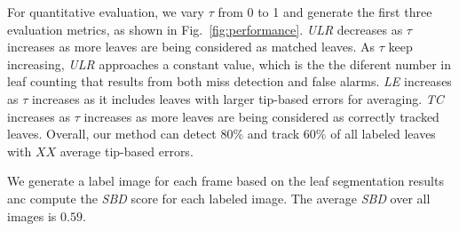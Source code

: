 For quantitative evaluation, we vary $\tau$ from 0 to 1 and generate the first three evaluation metrics, as shown in Fig.~\ref{fig:performance}.
{\it{ULR}} decreases as $\tau$ increases as more leaves are being considered as matched leaves.  
As $\tau$ keep increasing, {\it{ULR}} approaches a constant value, which is the the diferent number in leaf counting that results from both miss detection and false alarms. 
{\it{LE}} increases as $\tau$ increases as it includes leaves with larger tip-based errors for averaging. 
{\it{TC}} increases as $\tau$ increases as more leaves are being considered as correctly tracked leaves. 
Overall, our method can detect $80\%$ and track $60\%$ of all labeled leaves with $XX$ average tip-based errors. 

We generate a label image for each frame based on the leaf segmentation results anc compute the {\it{SBD}} score for each labeled image. 
The average {\it{SBD}} over all images is $0.59$.







